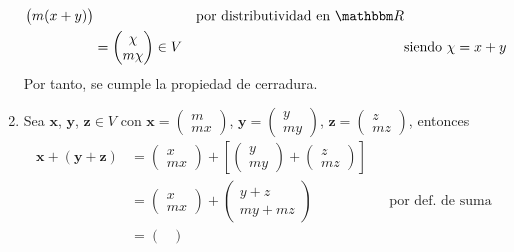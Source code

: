 \begin{examplebox}{}{}
\begin{enumerate}[label=\roman*), topsep=6pt, itemsep=0pt]
\begin{align*}
\begin{pmatrix}
                m(x + y)
            \end{pmatrix} && \text{por distributividad en $\RR$} \\
            & = \begin{pmatrix}
                \chi \\
                m\chi
            \end{pmatrix} \in V && \text{siendo $\chi = x + y$}
        \end{align*}
        Por tanto, se cumple la propiedad de cerradura.\newpage
        \item Sea $\mathbf{x}$, $\mathbf{y}$, $\mathbf{z} \in V$ con $\mathbf{x} = \begin{pmatrix}
            m \\
            mx
        \end{pmatrix}$, $\mathbf{y} = \begin{pmatrix}
            y \\
            my
        \end{pmatrix}$, $\mathbf{z} = \begin{pmatrix}
            z \\
            mz
        \end{pmatrix}$, entonces
        \begin{align*}
            \mathbf{x} + (\mathbf{y} + \mathbf{z}) & = \begin{pmatrix}
                x \\
                mx
            \end{pmatrix} + \left[ \begin{pmatrix}
                y \\
                my
            \end{pmatrix} + \begin{pmatrix}
                z \\
                mz
            \end{pmatrix} \right] \\
            & = \begin{pmatrix}
                x \\
                mx
            \end{pmatrix} + \begin{pmatrix}
                y + z \\
                my + mz
            \end{pmatrix} && \text{por def. de suma} \\
            & = \begin{pmatrix}

\end{pmatrix}
\end{align*}
\end{enumerate}
\end{examplebox}
